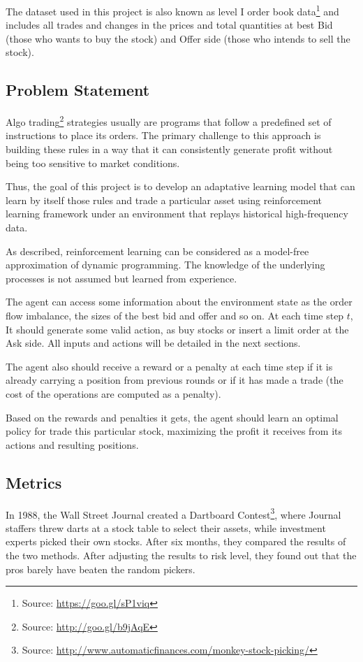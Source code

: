 \documentclass[a4paper]{article}
\begin{document}
The dataset used in this project is also known as level I order book data\footnote{Source: \url{https://goo.gl/sP1viq}} and includes all trades and changes in the prices and total quantities at best Bid (those who wants to buy the stock) and Offer side (those who intends to sell the stock).


\subsection{Problem Statement}
Algo trading\footnote{Source: \url{http://goo.gl/b9jAqE}} strategies usually are programs that follow a predefined set of instructions to place its orders. The primary challenge to this approach is building these rules in a way that it can consistently generate profit without being too sensitive to market conditions.

Thus, the goal of this project is to develop an adaptative learning model that can learn by itself those rules and trade a particular asset using reinforcement learning framework under an environment that replays historical high-frequency data.

As \cite{chan2001electronic} described, reinforcement learning can be considered as a model-free approximation of dynamic programming. The knowledge of the underlying processes is not assumed but learned from experience.

The agent can access some information about the environment state as the order flow imbalance, the sizes of the best bid and offer and so on. At each time step $t$, It should generate some valid action, as buy stocks or insert a limit order at the Ask side. All inputs and actions will be detailed in the next sections.

The agent also should receive a reward or a penalty at each time step if it is already carrying a position from previous rounds or if it has made a trade (the cost of the operations are computed as a penalty).

Based on the rewards and penalties it gets, the agent should learn an optimal policy for trade this particular stock, maximizing the profit it receives from its actions and resulting positions.

\subsection{Metrics}
In 1988, the Wall Street Journal created a Dartboard Contest\footnote{Source: \url{http://www.automaticfinances.com/monkey-stock-picking/}}, where Journal staffers threw darts at a stock table to select their assets, while investment experts picked their own stocks. After six months, they compared the results of the two methods. After adjusting the results to risk level, they found out that the pros barely have beaten the random pickers.
\end{document}
